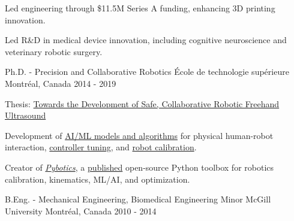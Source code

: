 \documentclass[11pt, letterpaper]{awesome-cv}
\begin{document}
\begin{cventries}
    {
        \begin{cvitems}
            \item{Led engineering through \$11.5M Series A funding, enhancing 3D printing innovation.}
        \end{cvitems}
    }

    {
        \begin{cvitems}
            \item{Led R\&D in medical device innovation, including cognitive neuroscience and veterinary robotic surgery.}
        \end{cvitems}
    }
\end{cventries}

\begin{cventries}
    \cventry
    {Ph.D. - Precision and Collaborative Robotics}
    {École de technologie supérieure}
    {Montréal, Canada}
    {2014 - 2019}
    {
        \begin{cvitems}
            \item{Thesis: \href{https://www.nicholasnadeau.com/publication/nadeau-2019-towards/}{Towards the Development of Safe, Collaborative Robotic Freehand Ultrasound}}
            \item{Development of \href{https://www.nicholasnadeau.com/talk/hardware-in-the-loop-training-robot-contact-in-an-unstructured-environment/}{AI/ML models and algorithms} for physical human-robot interaction, \href{https://www.nicholasnadeau.com/publication/nadeau-2018-evolutionary/}{controller tuning}, and \href{https://www.nicholasnadeau.com/publication/nadeau-2019-impedance/}{robot calibration}.}
            \item{Creator of \href{https://github.com/EngNadeau/pybotics}{\textit{Pybotics}}, a \href{https://joss.theoj.org/papers/10.21105/joss.01738}{published} open-source Python toolbox for robotics calibration, kinematics, ML/AI, and optimization.}
        \end{cvitems}
    }

    \cventry
    {B.Eng. - Mechanical Engineering, Biomedical Engineering Minor}
    {McGill University}
    {Montréal, Canada}
    {2010 - 2014}
    {
        \begin{cvitems}
        \end{cvitems}
    }
\end{cventries}
\end{document}
